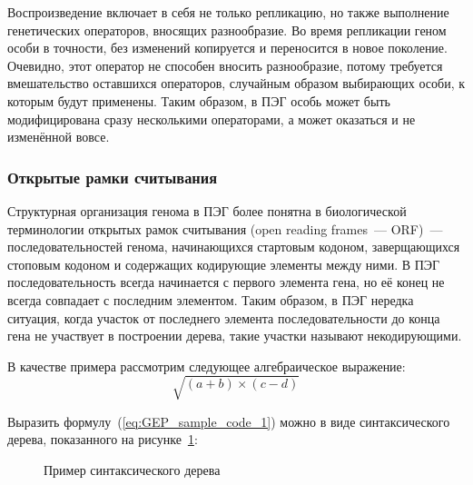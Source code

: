 Воспроизведение включает в себя не только репликацию, но также выполнение генетических операторов, вносящих разнообразие. Во время репликации геном особи в точности, без изменений копируется и переносится в новое поколение. Очевидно, этот оператор не способен вносить разнообразие, потому требуется вмешательство оставшихся операторов, случайным образом выбирающих особи, к которым будут применены. Таким образом, в ПЭГ особь может быть модифицирована сразу несколькими операторами, а может оказаться и не изменённой вовсе.


\subsubsection{Открытые рамки считывания}

Структурная организация генома в ПЭГ более понятна в биологической терминологии открытых рамок считывания (open reading frames~--- ORF)~--- последовательностей генома, начинающихся стартовым кодоном, заверщающихся стоповым кодоном и содержащих кодирующие элементы между ними. В ПЭГ последовательность всегда начинается с первого элемента гена, но её конец не всегда совпадает с последним элементом. Таким образом, в ПЭГ нередка ситуация, когда участок от последнего элемента последовательности до конца гена не участвует в построении дерева, такие участки называют некодирующими.

В качестве примера рассмотрим следующее алгебраическое выражение:
\begin{equation}
\label{eq:GEP_sample_code_1}
\sqrt{(a+b)\times(c-d)}
\end{equation}

Выразить формулу~(\ref{eq:GEP_sample_code_1}) можно в виде синтаксического дерева, показанного на рисунке~\ref{img:GEP_ET_sample_1}:
\begin{figure} [h]
  \center
  \caption{Пример синтаксического дерева}
  \label{img:GEP_ET_sample_1}
\end{figure}

